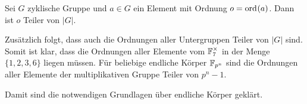 \begin{satz}
    Sei $G$ zyklische Gruppe und $a \in G$ ein Element mit Ordnung $o = \ord{a}$. Dann ist $o$ Teiler von $|G|$.
\end{satz}

Zusätzlich folgt, dass auch die Ordnungen aller Untergruppen Teiler von $|G|$ sind. Somit ist klar, dass die Ordnungen aller Elemente vom $\field{7}^\times$ in der Menge $\{1,2,3,6\}$ liegen müssen. Für beliebige endliche Körper $\field{p}[n]$ sind die Ordnungen aller Elemente der multiplikativen Gruppe Teiler von $p^n-1$.

Damit sind die notwendigen Grundlagen über endliche Körper geklärt. 